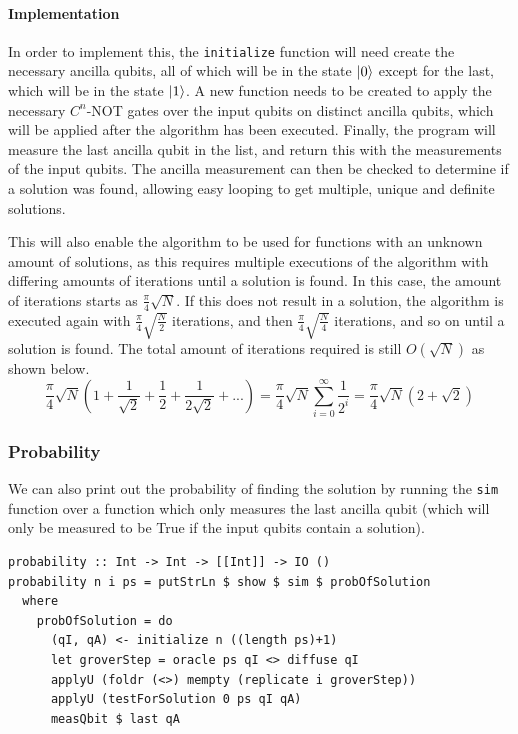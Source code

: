\documentclass[a4paper,10pt, titlepage, twoside]{article}
\begin{document}
\paragraph{Implementation}
In order to implement this, the \texttt{initialize} function will need create the necessary ancilla qubits, all of which will be in the state $\ket 0$ except for the last, which will be in the state $\ket 1$. A new function needs to be created to apply the necessary $C^n$-NOT gates over the input qubits on distinct ancilla qubits, which will be applied after the algorithm has been executed. Finally, the program will measure the last ancilla qubit in the list, and return this with the measurements of the input qubits. The ancilla measurement can then be checked to determine if a solution was found, allowing easy looping to get multiple, unique and definite solutions. \par
This will also enable the algorithm to be used for functions with an unknown amount of solutions, as this requires multiple executions of the algorithm with differing amounts of iterations until a solution is found. In this case, the amount of iterations starts as $\frac{\pi}{4}\sqrt{N}$. If this does not result in a solution, the algorithm is executed again with $\frac{\pi}{4}\sqrt{\frac{N}{2}}$ iterations, and then $\frac{\pi}{4}\sqrt{\frac{N}{4}}$ iterations, and so on until a solution is found. The total amount of iterations required is still $O(\sqrt N)$ as shown below.
$$\frac{\pi}{4}\sqrt N \left(1 + \frac{1}{\sqrt 2} + \frac{1}{2} + \frac{1}{2\sqrt 2} + ...\right) = \frac{\pi}{4}\sqrt N \sum_{i=0}^{\infty}\frac{1}{2^i} = \frac{\pi}{4}\sqrt N (2 + \sqrt 2)$$

\subsubsection{Probability}
We can also print out the probability of finding the solution by running the \texttt{sim} function over a function which only measures the last ancilla qubit (which will only be measured to be True if the input qubits contain a solution).

\begin{verbatim}
probability :: Int -> Int -> [[Int]] -> IO ()
probability n i ps = putStrLn $ show $ sim $ probOfSolution
  where
    probOfSolution = do
      (qI, qA) <- initialize n ((length ps)+1)
      let groverStep = oracle ps qI <> diffuse qI
      applyU (foldr (<>) mempty (replicate i groverStep))
      applyU (testForSolution 0 ps qI qA)
      measQbit $ last qA
\end{verbatim}
\end{document}
